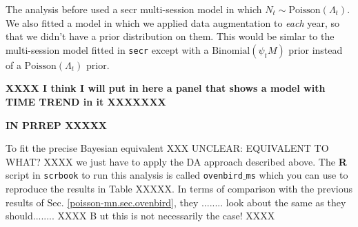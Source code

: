 The analysis before used a secr multi-session model in which $N_{t}
\sim \mbox{Poisson}(\Lambda_{t})$. We also fitted a model in which we
applied data augmentation to {\it each} year, so that we didn't have a
prior distribution on them.  This would be simlar to the multi-session
model fitted in \mbox{\tt secr} except with a
$\mbox{Binomial}(\psi_{t}M)$ prior instead of a
$\mbox{Poisson}(\Lambda_{t})$ prior.

{\bf
XXXX I think I will put in here a panel that shows a model with TIME
TREND in it XXXXXXX
}

{\bf IN PRREP XXXXX}

To fit the precise Bayesian equivalent XXX UNCLEAR: EQUIVALENT TO
WHAT? XXXX we just have to apply the DA approach described above. The
{\bf R} script in \mbox{\tt scrbook} to run this analysis is called
\mbox{\tt ovenbird$\_$ms} which you can use to reproduce the results
in Table XXXXX.  In terms of comparison with the previous results of
Sec. \ref{poisson-mn.sec.ovenbird}, they ........  look about the same
as they should........   XXXX B ut this is not necessarily the case! XXXX
